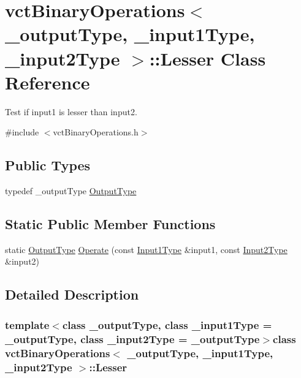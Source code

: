\hypertarget{classvct_binary_operations_1_1_lesser}{\section{vct\-Binary\-Operations$<$ \-\_\-output\-Type, \-\_\-input1\-Type, \-\_\-input2\-Type $>$\-:\-:Lesser Class Reference}
\label{classvct_binary_operations_1_1_lesser}
}


Test if input1 is lesser than input2.  




{\ttfamily \#include $<$vct\-Binary\-Operations.\-h$>$}

\subsection*{Public Types}
\begin{DoxyCompactItemize}
\item 
typedef \-\_\-output\-Type \hyperlink{classvct_binary_operations_1_1_lesser_a3f6be40aec12d4a06f0a16d729f765da}{Output\-Type}
\end{DoxyCompactItemize}
\subsection*{Static Public Member Functions}
\begin{DoxyCompactItemize}
\item 
static \hyperlink{classvct_binary_operations_1_1_lesser_a3f6be40aec12d4a06f0a16d729f765da}{Output\-Type} \hyperlink{classvct_binary_operations_1_1_lesser_a6649ee7e25530348419b0de177084357}{Operate} (const \hyperlink{classvct_binary_operations_a5e56a66a012d6a28c539a08a0021c45e}{Input1\-Type} \&input1, const \hyperlink{classvct_binary_operations_a929119af557a04a16b4d854981e49e1b}{Input2\-Type} \&input2)
\end{DoxyCompactItemize}


\subsection{Detailed Description}
\subsubsection*{template$<$class \-\_\-output\-Type, class \-\_\-input1\-Type = \-\_\-output\-Type, class \-\_\-input2\-Type = \-\_\-output\-Type$>$class vct\-Binary\-Operations$<$ \-\_\-output\-Type, \-\_\-input1\-Type, \-\_\-input2\-Type $>$\-::\-Lesser}


